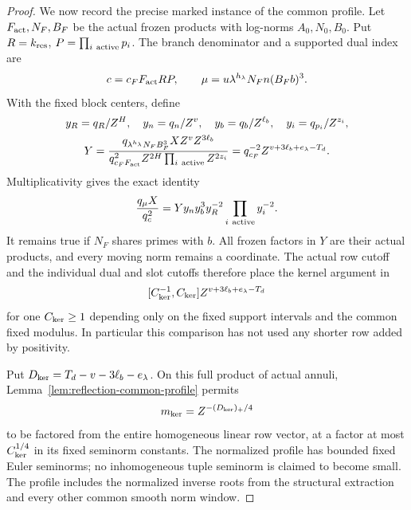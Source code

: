 \documentclass[11pt,a4paper]{article}
\numberwithin{equation}{section}
\numberwithin{figure}{section}
\theoremstyle{definition}
\theoremstyle{remark}
\begin{document}
\begin{proof}
We now record the precise marked instance of the common profile.  Let
\(F_{\rm act},N_F,B_F\) be the actual frozen products with log-norms
\(A_0,N_0,B_0\).  Put \(R=k_{\rm res}\), \(P=\prod_{i\ {\rm active}}p_i\).
The branch denominator and a supported dual index are
\[
 c=c_FF_{\rm act}RP,\qquad
 \mu=u\lambda^{h_\lambda}N_Fn(B_Fb)^3.
\]
With the fixed block centers, define
\[
 \begin{gathered}
 y_R=q_R/Z^H,\quad y_n=q_n/Z^v,\quad
 y_b=q_b/Z^{\ell_b},\quad y_i=q_{p_i}/Z^{z_i},\\
 Y=\frac{q_{\lambda^{h_\lambda}N_FB_F^3}X Z^vZ^{3\ell_b}}
          {q_{c_FF_{\rm act}}^2Z^{2H}\prod_{i\ {\rm active}}Z^{2z_i}}
   =q_{c_F}^{-2}Z^{v+3\ell_b+e_\lambda-T_d}.
 \end{gathered}
\]
Multiplicativity gives the exact identity
\begin{equation}\label{eq:reflection-actual-annuli}
 \frac{q_\mu X}{q_c^2}
       =Yy_ny_b^3y_R^{-2}\prod_{i\ {\rm active}}y_i^{-2}.
\end{equation}
It remains true if \(N_F\) shares primes with \(b\).  All frozen factors
in \(Y\) are their actual products, and every moving norm remains a coordinate.
The actual row cutoff and the individual dual and slot cutoffs therefore place
the kernel argument in
\[
 [C_{\rm ker}^{-1},C_{\rm ker}]
       Z^{v+3\ell_b+e_\lambda-T_d}
\]
for one \(C_{\rm ker}\ge1\) depending only on the fixed support intervals and
the common fixed modulus.  In particular this comparison has not used any
shorter row added by positivity.

Put \(D_{\rm ker}=T_d-v-3\ell_b-e_\lambda\).  On this full product of actual
annuli, Lemma~\ref{lem:reflection-common-profile} permits
\[
 m_{\rm ker}=Z^{-(D_{\rm ker})_+/4}
\]
to be factored from the entire homogeneous linear row vector, at a factor
at most \(C_{\rm ker}^{1/4}\) in its fixed seminorm constants.  The normalized
profile has bounded fixed Euler seminorms; no inhomogeneous tuple seminorm is
claimed to become small.  The profile includes the normalized inverse roots
from the structural extraction and every other common smooth norm window.


\end{proof}
\end{document}

